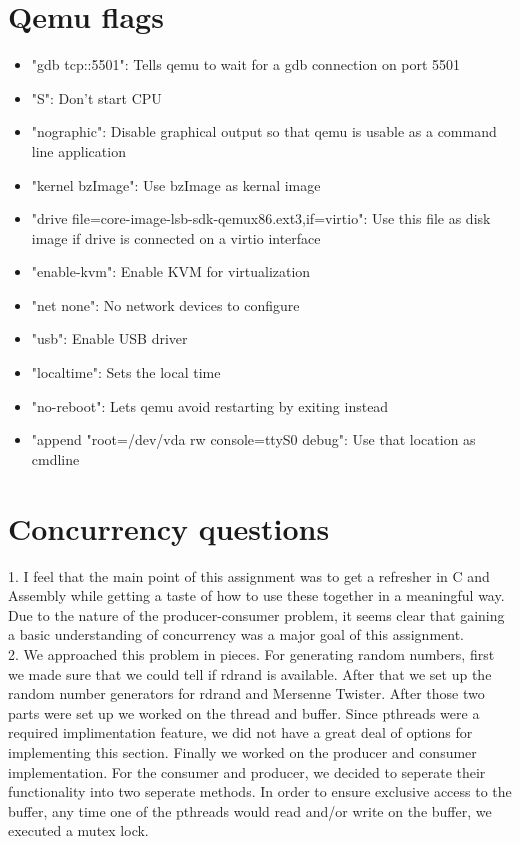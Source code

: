 \documentclass[letterpaper,10pt,titlepage]{article}
\begin{document}
\section{Qemu flags}
    \begin{itemize}
	\item "gdb tcp::5501": Tells qemu to wait for a gdb connection on port 5501
	\item "S": Don't start CPU
	\item "nographic": Disable graphical output so that qemu is usable as a command line application
	\item "kernel bzImage": Use bzImage as kernal image
	\item "drive file=core-image-lsb-sdk-qemux86.ext3,if=virtio": Use this file as disk image if drive is connected on a virtio interface
	\item "enable-kvm": Enable KVM for virtualization
	\item "net none": No network devices to configure
	\item "usb": Enable USB driver
	\item "localtime": Sets the local time
	\item "no-reboot": Lets qemu avoid restarting by exiting instead
	\item "append "root=/dev/vda rw console=ttyS0 debug": Use that location as cmdline	
    \end{itemize}

\section{Concurrency questions}
    1. I feel that the main point of this assignment was to get a refresher in C and Assembly while getting a taste of how to use these together in a meaningful way. Due to the nature of the producer-consumer problem, it seems clear that gaining a basic understanding of concurrency was a major goal of this assignment. \\

    2. We approached this problem in pieces. For generating random numbers, first we made sure that we could tell if rdrand is available. After that we set up the random number generators for rdrand and Mersenne Twister. After those two parts were set up we worked on the thread and buffer. Since pthreads were a required implimentation feature, we did not have a great deal of options for implementing this section. Finally we worked on the producer and consumer implementation. For the consumer and producer, we decided to seperate their functionality into two seperate methods. In order to ensure exclusive access to the buffer, any time one of the pthreads would read and/or write on the buffer, we executed a mutex lock.\\
\end{document}

